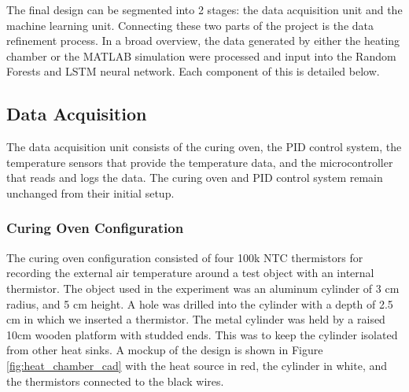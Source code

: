 The final design can be segmented into 2 stages: the data acquisition unit and the machine learning unit. Connecting these two parts of the project is the data refinement process. In a broad overview, the data generated by either the heating chamber or the MATLAB simulation were processed and input into the Random Forests and LSTM neural network. Each component of this is detailed below.

\subsection{Data Acquisition}
The data acquisition unit consists of the curing oven, the PID control system, the temperature sensors that provide the temperature data, and the microcontroller that reads and logs the data. The curing oven and PID control system remain unchanged from their initial setup. %

\subsubsection{Curing Oven Configuration}
The curing oven configuration consisted of four 100k NTC thermistors for recording the external air temperature around a test object with an internal thermistor. The object used in the experiment was an aluminum cylinder of 3 cm radius, and 5 cm height. A hole was drilled into the cylinder with a depth of 2.5 cm in which we inserted a thermistor. The metal cylinder was held by a raised 10cm wooden platform with studded ends. This was to keep the cylinder isolated from other heat sinks. A mockup of the design is shown in Figure \ref{fig:heat_chamber_cad} with the heat source in red, the cylinder in white, and the thermistors connected to the black wires. 

